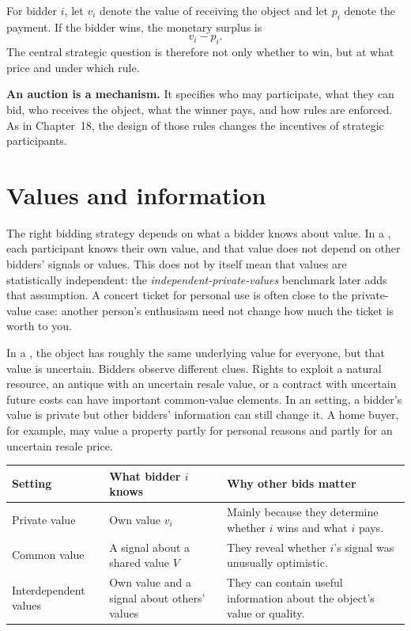 For bidder \(i\), let \(v_i\) denote the value of receiving the object and
let \(p_i\) denote the payment. If the bidder wins, the monetary surplus is
\[
v_i-p_i.
\]
The central strategic question is therefore not only whether to win, but at
what price and under which rule.

\begin{keyidea}
\textbf{An auction is a mechanism.}
It specifies who may participate, what they can bid, who receives the object,
what the winner pays, and how rules are enforced. As in Chapter~18, the design
of those rules changes the incentives of strategic participants.
\end{keyidea}

\section{Values and information}

The right bidding strategy depends on what a bidder knows about value. In a
, each participant knows their own value, and
that value does not depend on other bidders' signals or values. This does not
by itself mean that values are statistically independent: the
\emph{independent-private-values} benchmark later adds that assumption. A
concert ticket for personal use is often close to the private-value case:
another person's enthusiasm need not change how much the ticket is worth to
you.

In a , the object has roughly the same
underlying value for everyone, but that value is uncertain. Bidders observe
different clues. Rights to exploit a natural resource, an antique with an
uncertain resale value, or a contract with uncertain future costs can have
important common-value elements. In an 
setting, a bidder's value is private but other bidders' information can still
change it. A home buyer, for example, may value a property partly for personal
reasons and partly for an uncertain resale price.

\begin{center}
\renewcommand{\arraystretch}{1.2}
\begin{tabular}{@{}p{2.55cm}p{3.65cm}p{4.65cm}@{}}
  \toprule
  Setting & What bidder \(i\) knows & Why other bids matter\\
  \midrule
  Private value & Own value \(v_i\) & Mainly because they determine whether \(i\) wins and what \(i\) pays.\\
  Common value & A signal about a shared value \(V\) & They reveal whether \(i\)'s signal was unusually optimistic.\\
  Interdependent values & Own value and a signal about others' values & They can contain useful information about the object's value or quality.\\
  \bottomrule
\end{tabular}
\end{center}

